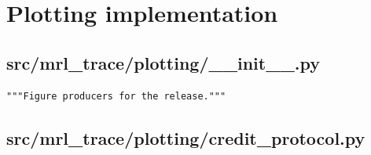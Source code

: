 \documentclass[a4paper,10pt]{article}
\begin{document}
\section{Plotting implementation}
\label{sec:plotting}
\subsection{src/mrl\_trace/plotting/\_\_init\_\_.py}
\begin{Verbatim}
"""Figure producers for the release."""
\end{Verbatim}
\subsection{src/mrl\_trace/plotting/credit\_protocol.py}
\end{document}
